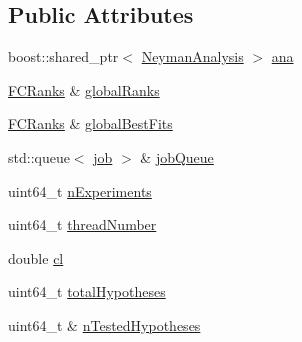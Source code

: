 \subsection*{Public Attributes}
\begin{DoxyCompactItemize}
\item 
boost\-::shared\-\_\-ptr$<$ \hyperlink{classNeymanAnalysis}{Neyman\-Analysis} $>$ \hyperlink{structNeymanThreadData_a4b9b47c80fd8fa5ea300485a923f2348}{ana}
\item 
\hyperlink{classFCRanks}{F\-C\-Ranks} \& \hyperlink{structNeymanThreadData_a800f5dd68444c0ec9654946105759afc}{global\-Ranks}
\item 
\hyperlink{classFCRanks}{F\-C\-Ranks} \& \hyperlink{structNeymanThreadData_a5de558380b8e1c7c08960526d91d8841}{global\-Best\-Fits}
\item 
std\-::queue$<$ \hyperlink{structjob}{job} $>$ \& \hyperlink{structNeymanThreadData_ad7e388c9438a16640110fbe9018fda90}{job\-Queue}
\item 
uint64\-\_\-t \hyperlink{structNeymanThreadData_a99154b06d67a82c8bf48112beabbd7ec}{n\-Experiments}
\item 
uint64\-\_\-t \hyperlink{structNeymanThreadData_a0d26db26796419914c2a9a35214a26b3}{thread\-Number}
\item 
double \hyperlink{structNeymanThreadData_af145feca7df9e9c5c88bec759d97ba8f}{cl}
\item 
uint64\-\_\-t \hyperlink{structNeymanThreadData_a129c6ff7d2f1d5102fa6543ff0683d1b}{total\-Hypotheses}
\item 
uint64\-\_\-t \& \hyperlink{structNeymanThreadData_acab7f8af86761370c3bb06132b0e92f5}{n\-Tested\-Hypotheses}
\end{DoxyCompactItemize}



